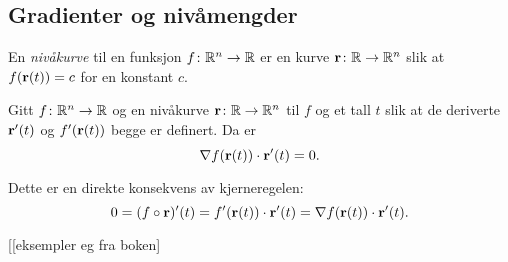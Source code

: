 \subsection{Gradienter og nivåmengder}

\begin{definisjon}
  En {\em nivåkurve} til en funksjon $f \colon \mathbb{R}^n \to \mathbb{R}$ er en kurve
  $\mathbf{r} \colon \mathbb{R} \to \mathbb{R}^n$
  slik at $f(\mathbf{r}(t)) = c$ for en konstant $c$.
\end{definisjon}
\begin{teorem}
  Gitt $f \colon \mathbb{R}^n \to \mathbb{R}$ og en nivåkurve $\mathbf{r} \colon \mathbb{R} \to \mathbb{R}^n$
  til $f$ og et tall $t$ slik at de deriverte  $\mathbf{r}'(t)$ og $f'(\mathbf{r}(t))$
  begge er definert. Da er 
  $$\nabla f(\mathbf{r}(t)) \cdot \mathbf{r}'(t) = 0.$$
\end{teorem}
Dette er en direkte konsekvens av kjerneregelen:
\begin{displaymath}
  0 = (f \circ \mathbf{r})'(t) =
  f'(\mathbf{r}(t)) \cdot \mathbf{r}'(t) =
  \nabla f(\mathbf{r}(t)) \cdot \mathbf{r}'(t).
\end{displaymath}

[[eksempler eg fra boken]


